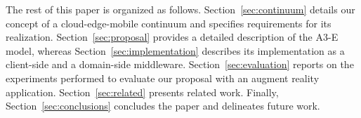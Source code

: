 

The rest of this paper is organized as follows. 
Section~\ref{sec:continuum} details our concept of a cloud-edge-mobile continuum and specifies requirements for its realization. Section~\ref{sec:proposal} provides a detailed description of the A3-E model, whereas Section~\ref{sec:implementation} describes its implementation as a client-side and a domain-side middleware. %
Section~\ref{sec:evaluation} reports on the experiments performed to evaluate our proposal with an augment reality application. Section~\ref{sec:related} presents related work. Finally, Section~\ref{sec:conclusions} concludes the paper and delineates future work.

